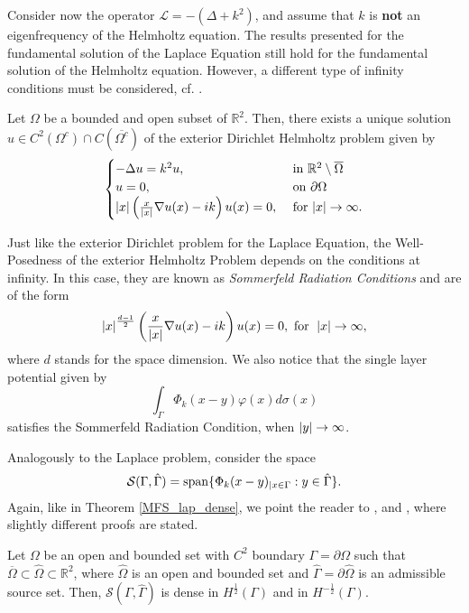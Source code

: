 Consider now the operator \(\mathcal{L} = -(\Delta + k^2)\), and assume that \(k\) is \textbf{not} an eigenfrequency of the Helmholtz equation. The results presented for the fundamental solution of the Laplace Equation still hold for the fundamental solution of the Helmholtz equation. However, a different type of infinity conditions must be considered, cf. \cite{colton2013integral}. 
\begin{theorem}
    Let \(\Omega\) be a bounded and open subset of \(\mathbb{R}^2\). Then, there exists a unique solution \(u \in C^2(\Omega^c) \cap C(\overline{\Omega^c})\) of the exterior Dirichlet Helmholtz problem given by
    \[
        \begin{cases}
            -\Delta u = k^2 u, & \text{ in }  \mathbb{R}^2\setminus \overline{\Omega}\\
            u = 0, & \text{ on }  \partial \Omega\\
            \abs{x} \left(\frac{x}{\abs{x}}\nabla u(x) - i k\right)u(x) = 0, & \text{ for }  \abs{x} \rightarrow \infty.
        \end{cases}
    \]
\end{theorem}
\begin{remark}\label{sommerfeld_conditions}
    Just like the exterior Dirichlet problem for the Laplace Equation, the Well-Posedness of the exterior Helmholtz Problem depends on the conditions at infinity. In this case, they are known as \textit{Sommerfeld Radiation Conditions} and are of the form
    \[
        \abs{x}^\frac{d-1}{2} \left(\frac{x}{\abs{x}}\nabla u(x) - i k \right)u(x) = 0, \text{ for } \; \abs{x} \rightarrow \infty,
    \]
    where \(d\) stands for the space dimension. We also notice that the single layer potential given by
    \[
        \int_\Gamma \Phi_k(x-y) \varphi(x) d\sigma(x)
    \]
    satisfies the Sommerfeld Radiation Condition, when \(\abs{y} \rightarrow \infty\).
\end{remark}
Analogously to the Laplace problem, consider the space
\[
    \mathcal{S}(\Gamma, \hat{\Gamma}) = \operatorname{span}\{\Phi_k(x-y)_{|x \in \Gamma} : y \in \hat{\Gamma}\}.
\]
Again, like in Theorem \ref{MFS_lap_dense}, we point the reader to \cite{alves2009choice}, \cite{svilen_phd} and \cite{alves2005new}, where slightly different proofs are stated.
\begin{theorem}
    Let \(\Omega\) be an open and bounded set with \(C^2\) boundary \(\Gamma = \partial \Omega\) such that \(\overline{\Omega} \subset \hat{\Omega} \subset \mathbb{R}^2\), where \(\hat{\Omega}\) is an open and bounded set and \(\hat{\Gamma} = \partial \hat{\Omega}\) is an admissible source set. Then, \(\mathcal{S}(\Gamma, \hat{\Gamma})\) is dense in \(H^\frac{1}{2}(\Gamma)\) and in \(H^{-\frac{1}{2}}(\Gamma)\).
\end{theorem}\label{MFS_helm_dense}
